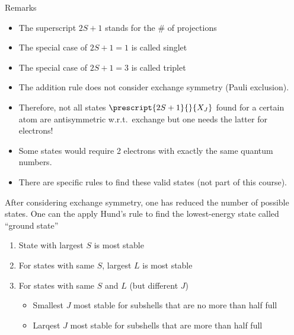 Remarks
\begin{itemize}
    \item The superscript $2S+1$ stands for the \# of projections
    \item The special case of $2S+1=1$ is called singlet
    \item The special case of $2S+1=3$ is called triplet
\end{itemize}


\begin{itemize}
    \item The addition rule does not consider exchange symmetry (Pauli exclusion).
    \item Therefore, not all states $\prescript{2S+1}{}{X_J}$ found for a certain atom are antisymmetric w.r.t.\ exchange but one needs the latter for electrons!
    \item Some states would require 2 electrons with exactly the same quantum numbers.
    \item There are specific rules to find these valid states (not part of this course).
\end{itemize}


After considering exchange symmetry, one has reduced the number of possible states. One can the apply Hund's rule to find the lowest-energy state called ``ground state''
\begin{enumerate}
    \item State with largest $S$ is most stable
    \item For states with same $S$, largest $L$ is most stable
    \item For states with same $S$ and $L$ (but different $J$)
          \begin{itemize}
              \item Smallest $J$ most stable for subshells that are no more than half full
              \item Larqest $J$ most stable for subshells that are more than half full
          \end{itemize}
\end{enumerate}










